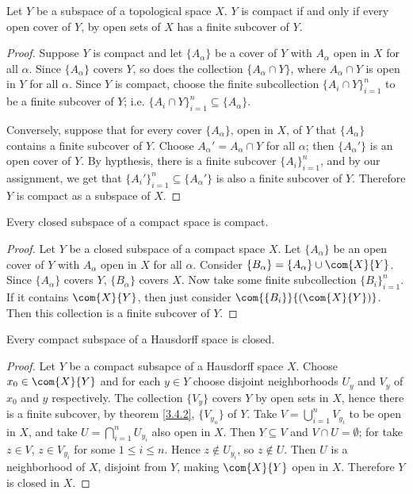 \begin{lemma}\label{3.4.1}
    Let $Y$ be a subspace of a topological space  $X$.  $Y$ is compact if and only if every open
    cover of  $Y$, by open sets of  $X$ has a finite subcover of $Y$.
\end{lemma}
\begin{proof}
    Suppose $Y$ is compact and let  $\{A_\alpha\}$ be a cover of $Y$ with  $A_\alpha$ open in  $X$
    for all  $\alpha$. Since  $\{A_\alpha\}$ covers $Y$, so does the collection  $\{A_\alpha \cap
    Y\}$, where $A_\alpha \cap Y$ is open in  $Y$ for all  $\alpha$. Since  $Y$ is compact, choose
    the finite subcollection  $\{A_i \cap Y\}_{i=1}^{n}$ to be a finite subcover of $Y$; i.e.
    $\{A_i \cap Y\}_{i=1}^{n} \subseteq \{A_\alpha\}$.

    Conversely, suppose that for every cover $\{A_\alpha\}$, open in  $X$, of  $Y$ that
    $\{A_\alpha\}$ contains a finite subcover of $Y$. Choose  $A_\alpha'=A_\alpha \cap Y$ for all
    $\alpha$; then $\{A_\alpha'\}$ is an open cover of $Y$.
    By hypthesis, there is a finite subcover $\{A_i\}_{i=1}^n$, and by our assignment, we
    get that $\{A_i'\}_{i=1}^n \subseteq \{A_\alpha'\}$ is also a finite subcover of $Y$. Therefore
     $Y$ is compact as a subspace of  $X$.
\end{proof}

\begin{theorem}\label{3.4.2}
    Every closed subspace of a compact space is compact.
\end{theorem}
\begin{proof}
    Let $Y$ be a closed subspace of a compact space $X$. Let $\{A_\alpha\}$ be an open cover of $Y$
    with  $A_\alpha$ open in  $X$ for all  $\alpha$. Consider  $\{B_\alpha\}=\{A_\alpha\} \cup
    \com{X}{Y}$. Since $\{A_\alpha\}$ covers $Y$,  $\{B_\alpha\}$ covers $X$. Now take some finite
    subcollection  $\{B_i\}_{i=1}^n$. If it contains $\com{X}{Y}$, then just consider
    $\com{\{B_i\}}{(\com{X}{Y})}$. Then this collection is a finite subcover of $Y$.
\end{proof}

\begin{theorem}\label{3.4.3}
    Every compact subspace of a Hausdorff space is closed.
\end{theorem}
\begin{proof}
    Let $Y$ be a compact subsapce of a Hausdorff space  $X$. Choose  $x_0 \in \com{X}{Y}$ and for
    each $y \in Y$ choose disjoint neighborhoods  $U_y$ and  $V_y$ of  $ x_0$ and $y$ respectively.
    The collection  $\{V_y\}$ covers $Y$ by open sets in  $X$, hence there is a finite subcover, by
    theorem \ref {3.4.2}, $\{V_{y_n}\}$ of $Y$. Take  $V=\bigcup_{i=1}^n{V_{y_i}}$ to be open in
$X$, and take  $U=\bigcap_{i=1}^n{U_{y_i}}$ also open in $X$. Then  $Y \subseteq V$ and  $V \cap
U=\emptyset$; for take $z \in V$,  $z \in V_{y_i}$ for some $1 \leq i \leq n$. Hence  $z \notin
U_{y_i}$, so $z \notin U$. Then  $U$ is a neighborhood of  $X$, disjoint from  $Y$, making
$\com{X}{Y}$ open in $X$. Therefore  $Y$ is closed in  $X$.
\end{proof}

